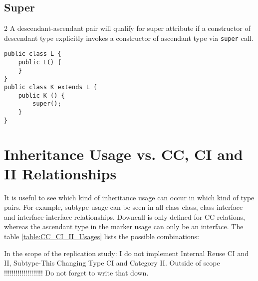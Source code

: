 \documentclass{uvamscse}
\begin{document}
\subsection{Super}
\begin{multicols} {2}
A descendant-ascendant pair will qualify for super attribute if a constructor of descendant type explicitly invokes a constructor of ascendant type via \texttt{super} call.
\columnbreak
\begin{verbatim}
public class L {
    public L() {
    }
}
public class K extends L {
    public K () {
   	    super();
   	}
}
\end{verbatim}
\end{multicols}


\section{Inheritance Usage vs. CC, CI and II Relationships}
It is useful to see which kind of inheritance usage can occur in which kind of type pairs. For example, subtype usage can be seen in all class-class, class-interface and interface-interface relationships. Downcall is only defined for CC relations, whereas the ascendant type in the marker usage can only be an interface. The table \ref{table:CC_CI_II_Usages} lists the possible combinations:

In the scope of the replication study: I do not implement Internal Reuse CI and II, Subtype-This Changing Type CI and Category II. Outside of scope !!!!!!!!!!!!!!!!!!!! Do not forget to write that down.
\end{document}
